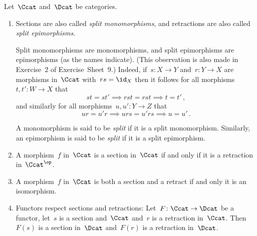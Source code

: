 \begin{remark*}
  Let~$\Ccat$ and~$\Dcat$ be categories.
  \begin{enumerate}
    \item
      Sections are also called \emph{split monomorphisms}, and retractions are also called \emph{split epimorphisms}.
  
      Split monomorphisms are monomorphisms, and split epimorphisms are epimorphisms (as the names indicate).
      (This observation is also made in Exercise~2 of Exercise~Sheet~9.)
      Indeed, if~$s \colon X \to Y$ and~$r \colon Y \to X$ are morphisms in~$\Ccat$ with~$rs = \id_X$ then it follows for all morphisms~$t, t' \colon W \to X$ that
      \[
        st = st'
        \implies
        rst = rst
        \implies
        t = t' \,,
      \]
      and similarly for all morphisms~$u, u' \colon Y \to Z$ that
      \[
        ur = u'r
        \implies
        urs = u'rs
        \implies
        u = u'  \,.
      \]
      
      A monomorphism is said to be \emph{split} if it is a split monomorphism.
      Similarly, an epimorphism is said to be \emph{split} if it is a split epimorphism.
    \item
      A morphism~$f$ in~$\Ccat$ is a section in~$\Ccat$ if and only if it is a retraction in~$\Ccat^\op$.
    \item
      A morphism~$f$ in~$\Ccat$ is both a section and a retract if and only it is an isomorphism.
    \item
      Functors respect sections and retractions:
      Let~$F \colon \Ccat \to \Dcat$ be a functor, let~$s$ is a section and~$\Ccat$ and~$r$ is a retraction in~$\Ccat$.
      Then~$F(s)$ is a section in~$\Dcat$ and~$F(r)$ is a retraction in~$\Dcat$.
  \end{enumerate}
\end{remark*}


